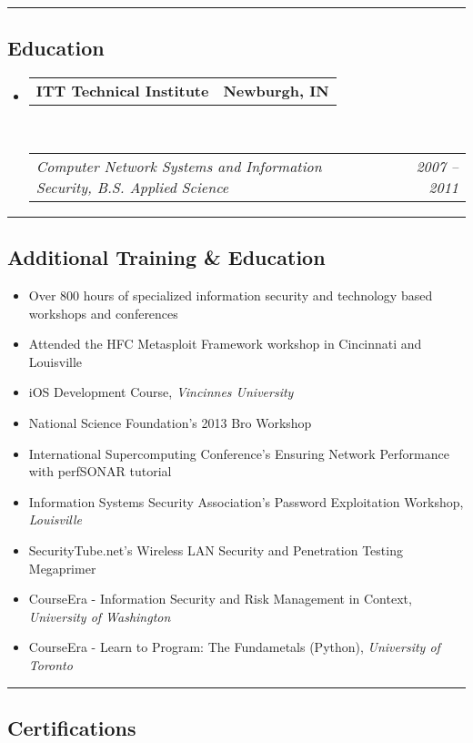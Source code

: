 \documentclass[10pt,letterpaper]{article}
\makeatletter
\newcommand{\headerrow}[2]
{\begin{tabular*}{\linewidth}{l@{\extracolsep{\fill}}r}
	#1 &
	#2 \\
\end{tabular*}}
\makeatother
\begin{document}
\hrule
\vspace{-0.4em}
\subsection*{Education}

\begin{itemize}
	\parskip=0.1em

	\item
	\headerrow
		{\textbf{ITT Technical Institute}}
		{\textbf{Newburgh, IN}}
	\\
	\headerrow
		{\emph{Computer Network Systems and Information Security, B.S. Applied Science}}
		{\emph{2007 -- 2011}}

\end{itemize}

\hrule
\vspace{-0.4em}
\subsection*{Additional Training \& Education}

\begin{itemize}
	\parskip=0.1em

	\item Over 800 hours of specialized information security and technology based workshops and conferences
	\item Attended the HFC Metasploit Framework workshop in Cincinnati and Louisville
	\item iOS Development Course, \textit{Vincinnes University}
	\item National Science Foundation's 2013 Bro Workshop
	\item International Supercomputing Conference's Ensuring Network Performance with perfSONAR tutorial
	\item Information Systems Security Association's Password Exploitation Workshop, \textit{Louisville}
	\item SecurityTube.net's Wireless LAN Security and Penetration Testing Megaprimer
	\item CourseEra - Information Security and Risk Management in Context, \textit{University of Washington}
	\item CourseEra - Learn to Program: The Fundametals (Python), \textit{University of Toronto}
\end{itemize}

\hrule
\vspace{-0.4em}
\subsection*{Certifications}
\end{document}
